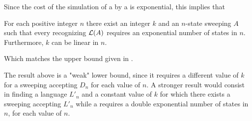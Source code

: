 Since the cost of the simulation of a \ONFA by a \ODFA is exponential, this implies that

\begin{coro}
	For each positive integer $n$ there exist an integer $k$ and an $n$-state sweeping \kDLA $A$ such that every \ONFA recognizing $\mathcal L(A)$ requires an exponential number of states in $n$.
	Furthermore, $k$ can be linear in $n$.
\end{coro}

Which matches the upper bound given in .

The result above is a "weak" lower bound, since it requires a different value of $k$ for a sweeping \kDLA accepting $D_n$ for each value of $n$.
A stronger result would consist in finding a language $L'_n$ and a constant value of $k$ for which there exists a sweeping \kDLA accepting $L'_n$ while a \ODFA requires a double exponential number of states in $n$, for each value of $n$.
